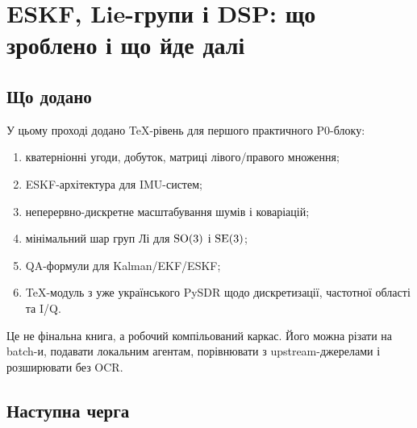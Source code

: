 \chapter{ESKF, Lie-групи і DSP: що зроблено і що йде далі}

\section{Що додано}

У цьому проході додано TeX-рівень для першого практичного P0-блоку:
\begin{enumerate}[leftmargin=2em]
\item кватерніонні угоди, добуток, матриці лівого/правого множення;
\item ESKF-архітектура для IMU-систем;
\item неперервно-дискретне масштабування шумів і коваріацій;
\item мінімальний шар груп Лі для $\mathrm{SO}(3)$ і $\mathrm{SE}(3)$;
\item QA-формули для Kalman/EKF/ESKF;
\item TeX-модуль з уже українського PySDR щодо дискретизації, частотної області та I/Q.
\end{enumerate}

Це не фінальна книга, а робочий компільований каркас. Його можна різати на batch-и, подавати локальним агентам, порівнювати з upstream-джерелами і розширювати без OCR.

\section{Наступна черга}

